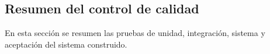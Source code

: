 \subsection{Resumen del control de calidad}
\label{sec:calidad-resumen}

En esta sección se resumen las pruebas de unidad, integración, sistema y aceptación del sistema construido.
